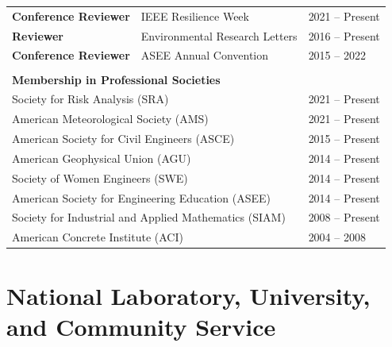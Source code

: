 \documentclass{article}[12pt]
\begin{document}
\begin{flushleft}
\begin{tabularx}{\textwidth}{lXl}
			\textbf{Conference Reviewer} &  IEEE Resilience Week & 2021 -- Present \\
			\textbf{Reviewer} & Environmental Research Letters  & 2016 -- Present  \\
			\textbf{Conference Reviewer} & ASEE Annual Convention & 2015 -- 2022 \\
			\\
			\multicolumn{3}{l}{\large{\textbf{Membership in Professional Societies}}}\\
			\multicolumn{2}{l}{Society for Risk Analysis (SRA)}& 2021 -- Present \\
			\multicolumn{2}{l}{American Meteorological Society (AMS)} & 2021 -- Present \\
			\multicolumn{2}{l}{American Society for Civil Engineers (ASCE)} & 2015 -- Present \\
			\multicolumn{2}{l}{American Geophysical Union (AGU)} & 2014 -- Present \\
			\multicolumn{2}{l}{Society of Women Engineers (SWE)} & 2014 -- Present\\
			\multicolumn{2}{l}{American Society for Engineering Education (ASEE)} & 2014 -- Present \\
			\multicolumn{2}{l}{Society for Industrial and Applied Mathematics (SIAM)} & 2008 -- Present \\
			\multicolumn{2}{l}{American Concrete Institute (ACI)} & 2004 -- 2008
		\end{tabularx}
	\end{flushleft}
	
	
	
	\vspace{-3em}
	
	\section*{National Laboratory, University, and Community Service}
	
\end{document}
